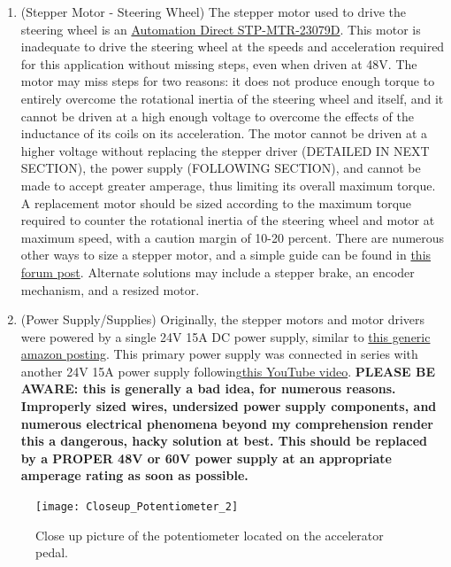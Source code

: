 \documentclass[12pt,oneside,letterpaper]{article}
\begin{document}
\begin{enumerate}
\item(Stepper Motor - Steering Wheel) The stepper motor used to drive the steering wheel is an \href{https://www.automationdirect.com/adc/shopping/catalog/motion_control/stepper_systems/dual_shaft_and_encoder_stepper_motors/stp-mtr-23079d}{Automation Direct STP-MTR-23079D}. This motor is inadequate to drive the steering wheel at the speeds and acceleration required for this application without missing steps, even when driven at 48V. The motor may miss steps for two reasons: it does not produce enough torque to entirely overcome the rotational inertia of the steering wheel and itself, and it cannot be driven at a high enough voltage to overcome the effects of the inductance of its coils on its acceleration. The motor cannot be driven at a higher voltage without replacing the stepper driver (DETAILED IN NEXT SECTION), the power supply (FOLLOWING SECTION), and cannot be made to accept greater amperage, thus limiting its overall maximum torque. A replacement motor should be sized according to the maximum torque required to counter the rotational inertia of the steering wheel and motor at maximum speed, with a caution margin of 10-20 percent. There are numerous other ways to size a stepper motor, and a simple guide can be found in \href{https://forum.arduino.cc/t/stepper-motor-basics/275223}{this forum post}. Alternate solutions may include a stepper brake, an encoder mechanism, and a resized motor.

\item(Power Supply/Supplies) Originally, the stepper motors and motor drivers were powered by a single 24V 15A DC power supply, similar to \href{https://shorturl.at/lGpR7}{this generic amazon posting}. This primary power supply was connected in series with another 24V 15A power supply following\href{https://www.youtube.com/watch?v=jbzb66dCbOc}{this YouTube video}. \textbf{PLEASE BE AWARE: this is generally a bad idea, for numerous reasons. Improperly sized wires, undersized power supply components, and numerous electrical phenomena beyond my comprehension render this a dangerous, hacky solution at best. This should be replaced by a PROPER 48V or 60V power supply at an appropriate amperage rating as soon as possible.}
\end{enumerate} 

\begin{figure}[htb]
\centering
\texttt{[image: Closeup\_Potentiometer\_2]}
\caption{Close up picture of the potentiometer located on the accelerator pedal.}
\label{fig:APP_pot}
\end{figure}
\end{document}

